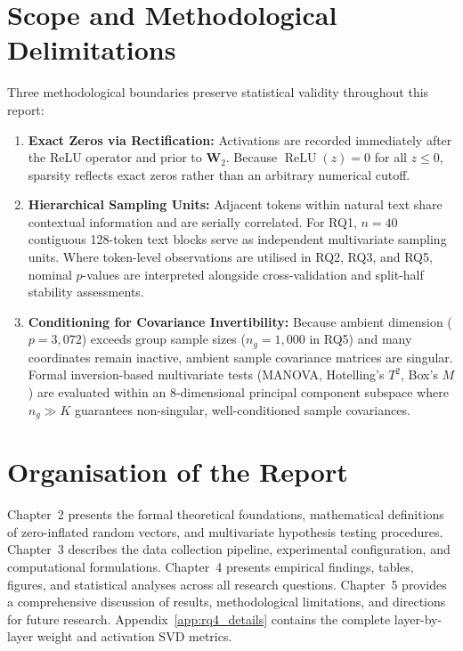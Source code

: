 \documentclass[12pt, a4paper, oneside]{report}
\theoremstyle{definition}
\newcommand{\mat}[1]{\mathbf{#1}}
\begin{document}
\section{Scope and Methodological Delimitations}

Three methodological boundaries preserve statistical validity throughout this report:
\begin{enumerate}
    \item \textbf{Exact Zeros via Rectification:} Activations are recorded immediately after the ReLU operator and prior to $\mat{W}_2$. Because $\operatorname{ReLU}(z) = 0$ for all $z \le 0$, sparsity reflects exact zeros rather than an arbitrary numerical cutoff.
    \item \textbf{Hierarchical Sampling Units:} Adjacent tokens within natural text share contextual information and are serially correlated. For RQ1, $n = 40$ contiguous 128-token text blocks serve as independent multivariate sampling units. Where token-level observations are utilised in RQ2, RQ3, and RQ5, nominal $p$-values are interpreted alongside cross-validation and split-half stability assessments.
    \item \textbf{Conditioning for Covariance Invertibility:} Because ambient dimension ($p = 3{,}072$) exceeds group sample sizes ($n_g = 1{,}000$ in RQ5) and many coordinates remain inactive, ambient sample covariance matrices are singular. Formal inversion-based multivariate tests (MANOVA, Hotelling's $T^2$, Box's $M$) are evaluated within an $8$-dimensional principal component subspace where $n_g \gg K$ guarantees non-singular, well-conditioned sample covariances.
\end{enumerate}

\section{Organisation of the Report}

Chapter~2 presents the formal theoretical foundations, mathematical definitions of zero-inflated random vectors, and multivariate hypothesis testing procedures. Chapter~3 describes the data collection pipeline, experimental configuration, and computational formulations. Chapter~4 presents empirical findings, tables, figures, and statistical analyses across all research questions. Chapter~5 provides a comprehensive discussion of results, methodological limitations, and directions for future research. Appendix~\ref{app:rq4_details} contains the complete layer-by-layer weight and activation SVD metrics.
\end{document}
